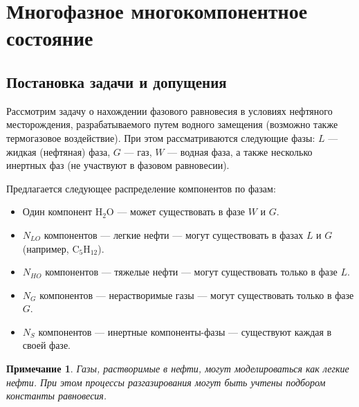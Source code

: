 \documentclass[12pt]{article}
\newtheorem{note}{Примечание}[section]
\begin{document}
\section{Многофазное многокомпонентное состояние}

\subsection{Постановка задачи и допущения}

Рассмотрим задачу о нахождении фазового равновесия в условиях нефтяного месторождения, разрабатываемого путем водного замещения (возможно также термогазовое воздействие). При этом рассматриваются следующие фазы: $L$ --- жидкая (нефтяная) фаза, $G$ --- газ, $W$ --- водная фаза, а также несколько инертных фаз (не  участвуют в фазовом равновесии).

Предлагается следующее распределение компонентов по фазам:
\begin{itemize}
\item Один компонент $\mathrm{H_2O}$ --- может существовать в фазе $W$ и $G$.
\item $N_{LO}$ компонентов --- легкие нефти --- могут существовать в фазах $L$ и $G$ (например, $\mathrm{C_5H_{12}}$).
\item $N_{HO}$ компонентов --- тяжелые нефти --- могут существовать только в фазе $L$.
\item $N_{G}$ компонентов --- нерастворимые газы --- могут существовать только в фазе $G$.
\item $N_{S}$ компонентов --- инертные компоненты-фазы --- существуют каждая в своей фазе.
\end{itemize}

\begin{note}
Газы, растворимые в нефти, могут моделироваться как легкие нефти. При этом процессы разгазирования могут быть учтены подбором константы равновесия.
\end{note}
\end{document}

